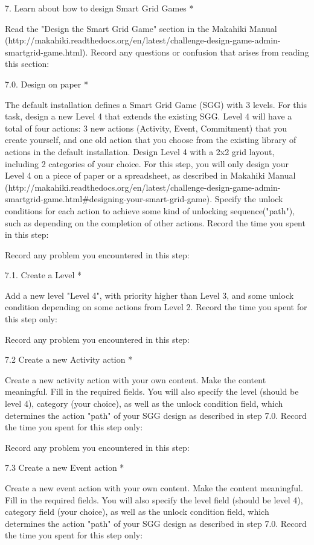 7. Learn about how to design Smart Grid Games *

Read the "Design the Smart Grid Game" section in the Makahiki Manual (http://makahiki.readthedocs.org/en/latest/challenge-design-game-admin-smartgrid-game.html). Record any questions or confusion that arises from reading this section:

7.0. Design on paper *

The default installation defines a Smart Grid Game (SGG) with 3 levels. For this task, design a new Level 4 that extends the existing SGG. Level 4 will have a total of four actions: 3 new actions (Activity, Event, Commitment) that you create yourself, and one old action that you choose from the existing library of actions in the default installation. Design Level 4 with a 2x2 grid layout, including 2 categories of your choice. For this step, you will only design your Level 4 on a piece of paper or a spreadsheet, as described in Makahiki Manual (http://makahiki.readthedocs.org/en/latest/challenge-design-game-admin-smartgrid-game.html\#designing-your-smart-grid-game). Specify the unlock conditions for each action to achieve some kind of unlocking sequence("path"), such as depending on the completion of other actions. Record the time you spent in this step:

Record any problem you encountered in this step:

7.1. Create a Level *

Add a new level "Level 4", with priority higher than Level 3, and some unlock condition depending on some actions from Level 2. Record the time you spent for this step only:

Record any problem you encountered in this step:

7.2 Create a new Activity action *

Create a new activity action with your own content. Make the content meaningful. Fill in the required fields. You will also specify the level (should be level 4), category (your choice), as well as the unlock condition field, which determines the action "path" of your SGG design as described in step 7.0. Record the time you spent for this step only:

Record any problem you encountered in this step:

7.3 Create a new Event action *

Create a new event action with your own content. Make the content meaningful. Fill in the required fields. You will also specify the level field (should be level 4), category field (your choice), as well as the unlock condition field, which determines the action "path" of your SGG design as described in step 7.0. Record the time you spent for this step only:

